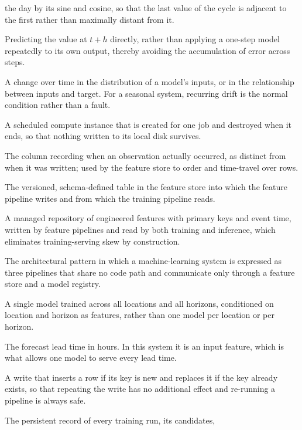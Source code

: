 \begin{description}[style=nextline,leftmargin=1.5em,labelsep=0pt,itemsep=5pt]
  the day by its sine and cosine, so that the last value of the cycle is adjacent
  to the first rather than maximally distant from it.
  \item[Direct multi-horizon forecasting] Predicting the value at $t+h$ directly,
  rather than applying a one-step model repeatedly to its own output, thereby
  avoiding the accumulation of error across steps.
  \item[Drift] A change over time in the distribution of a model's inputs, or in
  the relationship between inputs and target. For a seasonal system, recurring
  drift is the normal condition rather than a fault.
  \item[Ephemeral runner] A scheduled compute instance that is created for one job
  and destroyed when it ends, so that nothing written to its local disk survives.
  \item[Event time] The column recording when an observation actually occurred, as
  distinct from when it was written; used by the feature store to order and
  time-travel over rows.
  \item[Feature group] The versioned, schema-defined table in the feature store
  into which the feature pipeline writes and from which the training pipeline
  reads.
  \item[Feature store] A managed repository of engineered features with primary
  keys and event time, written by feature pipelines and read by both training and
  inference, which eliminates training-serving skew by construction.
  \item[Feature-Training-Inference (FTI)] The architectural pattern in which a
  machine-learning system is expressed as three pipelines that share no code path
  and communicate only through a feature store and a model registry.
  \item[Global model] A single model trained across all locations and all
  horizons, conditioned on location and horizon as features, rather than one model
  per location or per horizon.
  \item[Horizon] The forecast lead time in hours. In this system it is an input
  feature, which is what allows one model to serve every lead time.
  \item[Idempotent upsert] A write that inserts a row if its key is new and
  replaces it if the key already exists, so that repeating the write has no
  additional effect and re-running a pipeline is always safe.
  \item[Leaderboard] The persistent record of every training run, its candidates,

\end{description}
